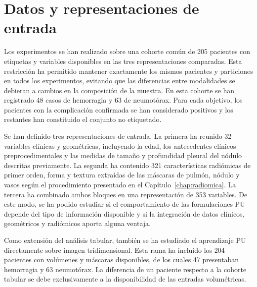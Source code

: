 \section{Datos y representaciones de entrada}

Los experimentos se han realizado sobre una cohorte común de 205 pacientes con etiquetas y variables disponibles en las tres representaciones comparadas. Esta restricción ha permitido mantener exactamente los mismos pacientes y particiones en todos los experimentos, evitando que las diferencias entre modalidades se debieran a cambios en la composición de la muestra. En esta cohorte se han registrado 48 casos de hemorragia y 63 de neumotórax. Para cada objetivo, los pacientes con la complicación confirmada se han considerado positivos y los restantes han constituido el conjunto no etiquetado.

Se han definido tres representaciones de entrada. La primera ha reunido 32 variables clínicas y geométricas, incluyendo la edad, los antecedentes clínicos preprocedimentales y las medidas de tamaño y profundidad pleural del nódulo descritas previamente. La segunda ha contenido 321 características radiómicas de primer orden, forma y textura extraídas de las máscaras de pulmón, nódulo y vasos según el procedimiento presentado en el Capítulo~\ref{chap:radiomica}. La tercera ha combinado ambos bloques en una representación de 353 variables. De este modo, se ha podido estudiar si el comportamiento de las formulaciones PU depende del tipo de información disponible y si la integración de datos clínicos, geométricos y radiómicos aporta alguna ventaja.

Como extensión del análisis tabular, también se ha estudiado el aprendizaje PU directamente sobre imagen tridimensional. Esta rama ha incluido los 204 pacientes con volúmenes y máscaras disponibles, de los cuales 47 presentaban hemorragia y 63 neumotórax. La diferencia de un paciente respecto a la cohorte tabular se debe exclusivamente a la disponibilidad de las entradas volumétricas.


